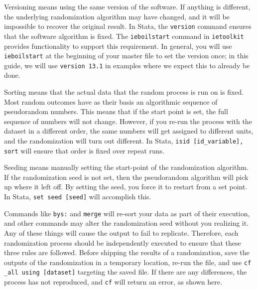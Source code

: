 Versioning means using the same version of the software.
If anything is different, the underlying randomization algorithm may have changed,
and it will be impossible to recover the original result.
In Stata, the \texttt{version} command ensures that the software algorithm is fixed.
The \texttt{ieboilstart} command in \texttt{ietoolkit} provides functionality to support this requirement.
In general, you will use \texttt{ieboilstart} at the beginning of your master file
to set the version once; in this guide, we will use
\texttt{version 13.1} in examples where we expect this to already be done.

Sorting means that the actual data that the random process is run on is fixed.
Most random outcomes have as their basis an algorithmic sequence of pseudorandom numbers.
This means that if the start point is set, the full sequence of numbers will not change.
However, if you re-run the process with the dataset in a different order,
the same numbers will get assigned to different units, and the randomization will turn out different.
In Stata, \texttt{isid [id\_variable], sort} will ensure that order is fixed over repeat runs.

Seeding means manually setting the start-point of the randomization algorithm.
If the randomization seed is not set, then the pseudorandom algorithm will pick up where it left off.
By setting the seed, you force it to restart from a set point.
In Stata, \texttt{set seed [seed]} will accomplish this.


{
}

Commands like \texttt{bys:} and \texttt{merge} will re-sort your data as part of their execution,
and other commands may alter the randomization seed without you realizing it.
Any of these things will cause the output to fail to replicate.
Therefore, each randomization process should be independently executed
to ensure that these three rules are followed.
Before shipping the results of a randomization,
save the outputs of the randomization in a temporary location,
re-run the file, and use \texttt{cf \_all using [dataset]} targeting the saved file.
If there are any differences, the process has not reproduced,
and \texttt{cf} will return an error, as shown here.

